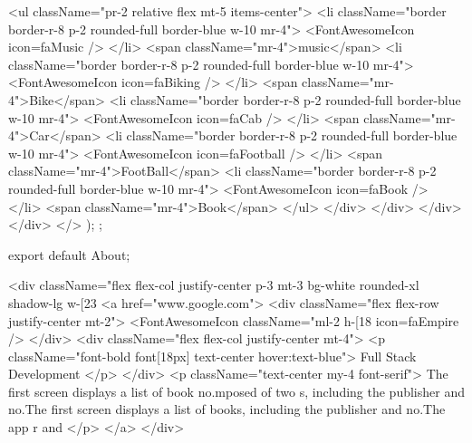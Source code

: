 {              <ul className="pr-2 relative flex mt-5 items-center">
                <li className="border border-r-8 p-2 rounded-full border-blue w-10 mr-4">
                  <FontAwesomeIcon icon={faMusic} />
                </li>
                <span className="mr-4">music</span>
                <li className="border border-r-8 p-2 rounded-full border-blue w-10 mr-4">
                  <FontAwesomeIcon icon={faBiking} />
                </li>
                <span className="mr-4">Bike</span>
                <li className="border border-r-8 p-2 rounded-full border-blue w-10 mr-4">
                  <FontAwesomeIcon icon={faCab} />
                </li>
                <span className="mr-4">Car</span>
                <li className="border border-r-8 p-2 rounded-full border-blue w-10 mr-4">
                  <FontAwesomeIcon icon={faFootball} />
                </li>
                <span className="mr-4">FootBall</span>
                <li className="border border-r-8 p-2 rounded-full border-blue w-10 mr-4">
                  <FontAwesomeIcon icon={faBook} />
                </li>
                <span className="mr-4">Book</span>
              </ul>
            </div>
          </div>
        </div>
      </div>
    </>
  );
};

export default About;


<div className="flex flex-col justify-center p-3 mt-3 bg-white rounded-xl shadow-lg w-[23%
      <a href="www.google.com">
        <div className="flex flex-row justify-center mt-2">
          <FontAwesomeIcon
            className="ml-2 h-[18%
            icon={faEmpire}
          />
        </div>
        <div className="flex flex-col justify-center mt-4">
          <p className="font-bold font[18px] text-center hover:text-blue">
            Full Stack Development
          </p>
        </div>
        <p className="text-center my-4 font-serif">
        The first screen displays a list of book no.mposed of two s, including the publisher and no.The first screen displays a list of books, including the publisher and no.The app r and
        </p>
      </a>
      </div>